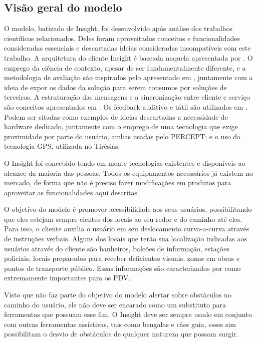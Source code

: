 \documentclass[twoside,english,brazilian]{UNISINOSartigo}
\begin{document}
\subsection{Visão geral do modelo}
O modelo, batizado de Insight, foi desenvolvido após análise dos trabalhos científicos relacionados. Deles foram aproveitados conceitos e funcionalidades consideradas essenciais e descartadas ideias consideradas incompatíveis com este trabalho. A arquitetura do cliente Insight é baseada naquela apresentada por . O emprego da ciência de contexto, apesar de ser fundamentalmente diferente, e a metodologia de avaliação são inspirados pelo apresentado em , juntamente com a ideia de expor os dados da solução para serem consumos por soluções de terceiros. A estruturação das mensagens e a sincronização entre cliente e serviço são conceitos apresentados em . Os feedback auditivo e tátil são utilizados em . Podem ser citadas como exemplos de ideias descartadas a necessidade de hardware dedicado, juntamente com o emprego de uma tecnologia que exige proximidade por parte do usuário, ambas usadas pelo PERCEPT; e o uso da tecnologia GPS, utilizada no Tirésias.

O Insight foi concebido tendo em mente tecnologias existentes e disponíveis ao alcance da maioria das pessoas. Todos os equipamentos necessários já existem no mercado, de forma que não é preciso fazer modificações em produtos para aproveitar as funcionalidades aqui descritas.

O objetivo do modelo é promover acessibilidade aos seus usuários, possibilitando que eles estejam sempre cientes dos locais ao seu redor e do caminho até eles. Para isso, o cliente auxilia o usuário em seu deslocamento curva-a-curva através de instruções verbais. Alguns dos locais que terão sua localização indicadas aos usuários através do cliente são banheiros, balcões de informação, estações policiais, locais preparados para receber deficientes visuais, zonas em obras e pontos de transporte público. Essas informações são caracterizados por  como extremamente importantes para os PDV.

Visto que não faz parte do objetivo do modelo alertar sobre obstáculos no caminho do usuário, ele não deve ser encarado como um substituto para ferramentas que possuam esse fim. O Insight deve ser sempre usado em conjunto com outras ferramentas assistivas, tais como bengalas e cães guia, esses sim possibilitam o desvio de obstáculos de qualquer natureza que possam surgir. 
\end{document}
